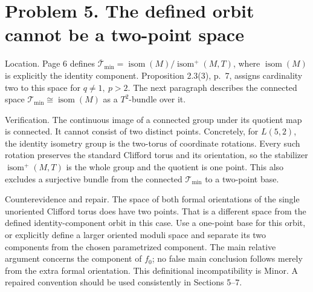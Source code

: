 \documentclass[10pt]{article}
\begin{document}
\section*{Problem 5. The defined orbit cannot be a two-point space}
Location. Page 6 defines \(\overline{\mathcal T}_{\min}=\operatorname{isom}(M)/\operatorname{isom}^+(M,T)\), where \(\operatorname{isom}(M)\) is explicitly the identity component. Proposition 2.3(3), p. 7, assigns cardinality two to this space for \(q\ne1,\ p>2\). The next paragraph describes the connected space \(\mathcal T_{\min}\cong\operatorname{isom}(M)\) as a \(T^2\)-bundle over it.\par
Verification. The continuous image of a connected group under its quotient map is connected. It cannot consist of two distinct points. Concretely, for \(L(5,2)\), the identity isometry group is the two-torus of coordinate rotations. Every such rotation preserves the standard Clifford torus and its orientation, so the stabilizer \(\operatorname{isom}^+(M,T)\) is the whole group and the quotient is one point. This also excludes a surjective bundle from the connected \(\mathcal T_{\min}\) to a two-point base.\par
Counterevidence and repair. The space of both formal orientations of the single unoriented Clifford torus does have two points. That is a different space from the defined identity-component orbit in this case. Use a one-point base for this orbit, or explicitly define a larger oriented moduli space and separate its two components from the chosen parametrized component. The main relative argument concerns the component of \(f_0\); no false main conclusion follows merely from the extra formal orientation. This definitional incompatibility is Minor. A repaired convention should be used consistently in Sections 5–7.\par
\end{document}
